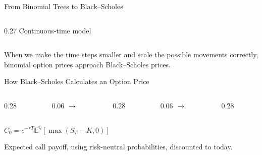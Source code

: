 \documentclass[aspectratio=169,10pt]{beamer}
\begin{document}
\begin{frame}{From Binomial Trees to Black--Scholes}
\begin{columns}[c,onlytextwidth]
\begin{column}{0.27\textwidth}
      \small Continuous-time model
    \end{column}
  \end{columns}
  \vspace{0.45cm}
  \begin{center}
    When we make the time steps smaller and scale the possible movements correctly, binomial option prices approach Black--Scholes prices.
  \end{center}
\end{frame}

\begin{frame}{How Black--Scholes Calculates an Option Price}
  \begin{columns}[c,onlytextwidth]
    \begin{column}{0.28\textwidth}
      \centering
    \end{column}
    \begin{column}{0.06\textwidth}
      \centering\Large $\longrightarrow$
    \end{column}
    \begin{column}{0.28\textwidth}
      \centering
    \end{column}
    \begin{column}{0.06\textwidth}
      \centering\Large $\longrightarrow$
    \end{column}
    \begin{column}{0.28\textwidth}
      \centering
    \end{column}
  \end{columns}
  \vspace{0.45cm}
  \begin{center}
    \Large $\displaystyle C_0=e^{-rT}\mathbb{E}^{\mathbb{Q}}[\max(S_T-K,0)]$
  \end{center}
  \centering\small Expected call payoff, using risk-neutral probabilities, discounted to today.
  \vspace{0.4cm}


\end{frame}
\end{document}
